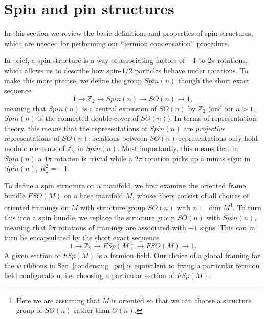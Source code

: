 \documentclass[12pt,a4paper]{article}
\newcounter{arrow}
\newcommand{\ra}{\rightarrow}
\newcommand{\zt}{\mathbb{Z}_2}
\newcommand\be            {\begin{equation}}
\newcommand\ee            {\end{equation}}
\begin{document}




\section{Spin and pin structures} \label{spin_and_pin}

In this section we review the basic definitions and properties of spin structures, which are needed for performing our ``fermion condensation'' procedure.   



In brief, a spin structure is a way of associating factors of $-1$ to $2\pi$ rotations, which allows us to describe how spin-$1/2$ particles behave under rotations. 
To make this more precise, we define the group $Spin(n)$ though the short exact sequence
\be \label{spin_gp_seq} 1 \ra \zt \ra Spin(n) \ra SO(n) \ra 1,\ee
meaning that $Spin(n)$ is a central extension of $SO(n)$ by $\zt$ (and for $n>1$, $Spin(n)$ is the connected double-cover of $SO(n)$).  
In terms of representation theory, this means that the representations of $Spin(n)$ are {\it projective} representations of $SO(n)$: relations between $SO(n)$ representations only hold modulo elements of $\zt$ in $Spin(n)$. Most importantly, this means that in $Spin(n)$ a $4\pi$ rotation is trivial while a $2\pi$ rotation picks up a minus sign: in $Spin(n)$, $R_\pi^2 = -1$.  

To define a spin structure on a manifold, we first examine the oriented frame bundle $FSO(M)$ on a base manifold $M$, whose fibers consist of all choices of oriented framings on $M$ with structure group $SO(n)$ with $n=\dim M$\footnote{Here we are assuming that $M$ is oriented so that we can choose a structure group of $SO(n)$ rather than $O(n)$.}. To turn this into a spin bundle, we replace the structure group $SO(n)$ with $Spin(n)$, meaning that $2\pi$ rotations of framings are associated with $-1$ signs. %
This can in turn be encapsulated by the short exact sequence 
\be \label{spinbundleseq} 1 \ra \zt \ra FSp(M) \ra FSO(M) \ra 1.\ee
A given section of $FSp(M)$ is a fermion field. Our choice of a global framing for the $\psi$ ribbons in Sec. \ref{condensing_psi} is equivalent to fixing a particular fermion field configuration, i.e. choosing a particular section of $FSp(M)$. 
\end{document}
